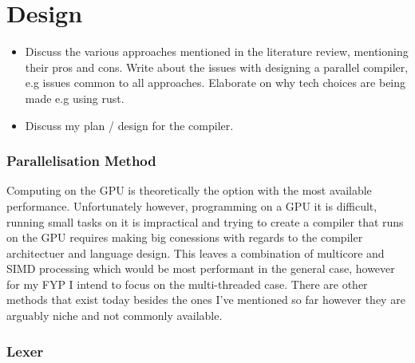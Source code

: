 \section{Design} \label{design}
\begin{sectionplan}
\begin{itemize}
	\item Discuss the various approaches mentioned in the literature review, mentioning
		  their pros and cons. Write about the issues with designing a parallel compiler,
		  e.g issues common to all approaches. Elaborate on why tech choices are being
		  made e.g using rust. 
	\item Discuss my plan / design for the compiler.
\end{itemize}


\end{sectionplan}

\subsubsection{Parallelisation Method}

\begin{roughwork}

	Computing on the GPU is theoretically the option with the most available
	performance. Unfortunately however,  programming on a GPU it is difficult,
	running small tasks on it is impractical and trying to create a compiler that
	runs on the GPU requires making big conessions with regards to the compiler
	architectuer and language design. This leaves a combination of multicore and
	SIMD processing which would be most performant in the general case, however for
	my FYP I intend to focus on the multi-threaded case. There are other methods
	that exist today besides the ones I’ve mentioned so far however they are
	arguably niche and not commonly available.

\end{roughwork}

\subsubsection{Lexer}

